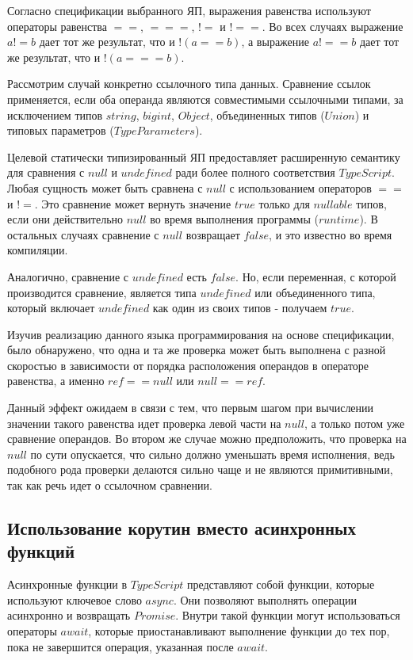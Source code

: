 \documentclass{mipt-thesis-bs}
\begin{document}
Согласно спецификации выбранного ЯП, выражения равенства
используют операторы равенства $==$, $===$, $!=$ и $!==$.
Во всех случаях выражение $a != b$ дает тот же результат,
что и $!(a == b)$, а выражение $a !== b$ дает тот же результат, что и $!(a === b)$.

Рассмотрим случай конкретно ссылочного типа данных. Сравнение ссылок применяется,
если оба операнда являются совместимыми ссылочными типами,
за исключением типов $string$, $bigint$, $Object$, объединенных типов
($Union$) и типовых параметров ($Type Parameters$).

Целевой статически типизированный ЯП предоставляет
расширенную семантику для сравнения с $null$ и $undefined$
ради более полного соответствия $TypeScript$. Любая сущность может
быть сравнена с $null$ с использованием операторов $==$ и $!=$. Это
сравнение может вернуть значение $true$ только для $nullable$ типов,
если они действительно $null$ во время выполнения
программы ($runtime$). В остальных случаях сравнение с $null$ возвращает $false$,
и это известно во время компиляции.

Аналогично, сравнение с $undefined$ есть $false$. Но, если
переменная, с которой производится сравнение, является типа
$undefined$ или объединенного типа, который включает
$undefined$ как один из своих типов - получаем $true$.

Изучив реализацию данного языка программирования на основе
спецификации, было обнаружено,
что одна и та же проверка может быть выполнена с разной скоростью в
зависимости от порядка расположения операндов в операторе равенства, а
именно $ref == null$ или $null == ref$.

Данный эффект ожидаем в связи с тем, что первым шагом при вычислении
значении такого равенства идет проверка левой части на $null$, а
только потом уже сравнение операндов. Во втором же случае можно
предположить, что проверка на $null$ по сути опускается, что сильно
должно уменьшать время исполнения, ведь подобного рода проверки делаются
сильно чаще и не являются примитивными, так как речь идет о ссылочном
сравнении.

\subsection{Использование корутин вместо асинхронных функций}

Асинхронные функции в $TypeScript$ представляют собой функции,
которые используют ключевое слово $async$. Они позволяют выполнять
операции асинхронно и возвращать $Promise$. Внутри такой функции
могут использоваться операторы $await$, которые приостанавливают
выполнение функции до тех пор, пока не завершится операция,
указанная после $await$.
\end{document}
